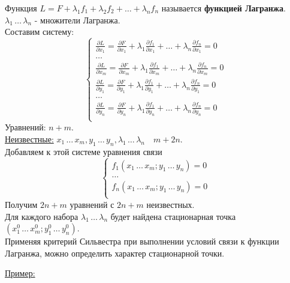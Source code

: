 \documentclass[12pt]{article}
\begin{document}
    Функция $L = F + \lambda_1 f_1 + \lambda_2 f_2 + \dots + \lambda_n f_n$ называется \textbf{функцией Лагранжа}.\\
    $\lambda_1\, \dots\, \lambda_n$ - множители Лагранжа.\\
    Составим систему:
    \[ \begin{cases}
        \frac{\partial L}{\partial x_1} = \frac{\partial F}{\partial x_1} + \lambda_1 \frac{\partial f_1}{\partial x_1} + \dots + \lambda_n \frac{\partial f_n}{\partial x_1} = 0\\
        \dots\\
        \frac{\partial L}{\partial x_m} = \frac{\partial F}{\partial x_m} + \lambda_1 \frac{\partial f_1}{\partial x_m} + \dots + \lambda_n \frac{\partial f_n}{\partial x_m} = 0\\
        \frac{\partial L}{\partial y_1} = \frac{\partial F}{\partial y_1} + \lambda_1 \frac{\partial f_1}{\partial y_1} + \dots + \lambda_n \frac{\partial f_n}{\partial y_1} = 0\\
        \dots\\
        \frac{\partial L}{\partial y_n} = \frac{\partial F}{\partial y_n} + \lambda_1 \frac{\partial f_1}{\partial y_n} + \dots + \lambda_n \frac{\partial f_n}{\partial y_n} = 0\\
    \end{cases} \]
    Уравнений: $n + m$.\\
    \underline{Неизвестные:} $x_1\, \dots\, x_m, y_1\, \dots\, y_n, \lambda_1\, \dots\, \lambda_n \quad m + 2n$.\\
    Добавляем к этой системе уравнения связи
    \[ \begin{cases}
        f_1(x_1\, \dots\, x_m; y_1\, \dots\, y_n) = 0\\
        \dots\\
        f_n(x_1\, \dots\, x_m; y_1\, \dots\, y_n) = 0\\
    \end{cases} \]
    Получим $2n+m$ уравнений с $2n+m$ неизвестных.\\
    Для каждого набора $\lambda_1\, \dots\, \lambda_n$ будет найдена стационарная точка $(x^0_1\, \dots\, x^0_m; y^0_1\, \dots\, y^0_n)$.\\
    Применяя критерий Сильвестра при выполнении условий связи к функции Лагранжа, можно определить характер стационарной точки.\par\noindent
    \underline{Пример:}
\end{document}
